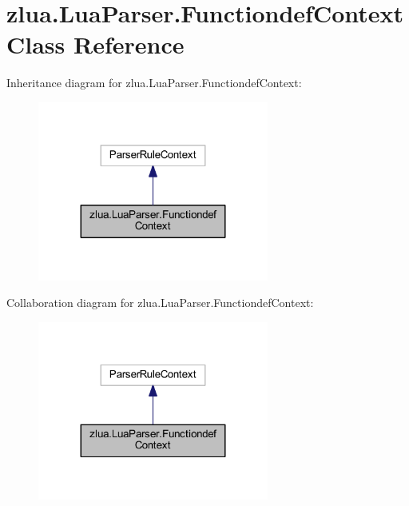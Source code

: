 \hypertarget{classzlua_1_1_lua_parser_1_1_functiondef_context}{}\section{zlua.\+Lua\+Parser.\+Functiondef\+Context Class Reference}
\label{classzlua_1_1_lua_parser_1_1_functiondef_context}


Inheritance diagram for zlua.\+Lua\+Parser.\+Functiondef\+Context\+:
\nopagebreak
\begin{figure}[H]
\begin{center}
\leavevmode
\includegraphics[width=215pt]{classzlua_1_1_lua_parser_1_1_functiondef_context__inherit__graph}
\end{center}
\end{figure}


Collaboration diagram for zlua.\+Lua\+Parser.\+Functiondef\+Context\+:
\nopagebreak
\begin{figure}[H]
\begin{center}
\leavevmode
\includegraphics[width=215pt]{classzlua_1_1_lua_parser_1_1_functiondef_context__coll__graph}
\end{center}
\end{figure}
